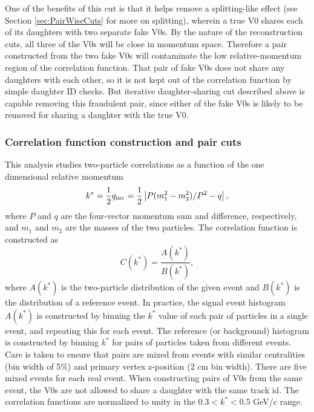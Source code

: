 
One of the benefits of this cut is that it helps remove a splitting-like effect (see Section \ref{sec:PairWiseCuts} for more on splitting), wherein a true V0 shares each of its daughters with two separate fake V0s.  
By the nature of the reconstruction cuts, all three of the V0s will be close in momentum space.  
Therefore a pair constructed from the two fake V0s will contaminate the low relative-momentum region of the correlation function.  
That pair of fake V0s does not share any daughters with each other, so it is not kept out of the correlation function by simple daughter ID checks.  
But iterative daughter-sharing cut described above is capable removing this fraudulent pair, since either of the fake V0s is likely to be removed for sharing a daughter with the true V0.


\subsubsection{Correlation function construction and pair cuts}
\label{sec:CFconstruct}

This analysis studies two-particle correlations as a function of the one dimensional relative momentum 
\begin{equation}
\label{eq:kstar}
k^*=\frac{1}{2}q_{\mathrm{inv}}=\frac{1}{2}\left\lvert P(m^2_1-m^2_2)/P^2 - q\right\rvert,
\end{equation}
where $P$ and $q$ are the four-vector momentum sum and difference, respectively, and $m_1$ and $m_2$ are the masses of the two particles.  
The correlation function is constructed as
\begin{equation}
\label{eq:CFDefinition}
C(k^*) = \frac{A(k^*)}{B(k^*)},
\end{equation}
where $A(k^*)$ is the two-particle distribution of the given event and $B(k^*)$ is the distribution of a reference event.  
In practice, the signal event histogram $A(k^*)$ is constructed by binning the $k^*$ value of each pair of particles in a single event, and repeating this for each event.  
The reference (or background) histogram is constructed by binning $k^*$ for pairs of particles taken from different events.  
Care is taken to ensure that pairs are mixed from events with similar centralities (bin width of 5\%) and primary vertex z-position (2 cm bin width).  
There are five mixed events for each real event.  
When constructing pairs of V0s from the same event, the V0s are not allowed to share a daughter with the same track id. 
The correlation functions are normalized to unity in the $ 0.3 < k^* < 0.5$ GeV/c range.


